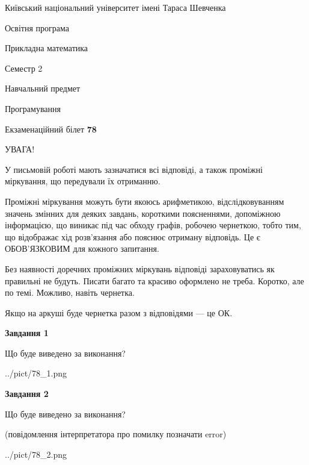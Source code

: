 \documentclass[12pt, ukrainian]{article}
\begin{document}
{{\begin {small}\par
{ \center  Київський національний університет імені Тараса Шевченка \par}
{\parbox {5 cm}{Освітня програма \hfill}{\parbox {7 cm}{Прикладна математика\hfill}}\parbox {6 cm}{\hfill Семестр 2}}\par
{\parbox {5 cm} {Навчальний предмет \hfill}\parbox {7 cm}{Програмування \hfill}\parbox {6cm}{\hfill}\par}\vspace{-7pt} \end{small}}{\center Екзаменаційний білет \No \textbf
{ 78 }\par}}
{
\begin {large}
УВАГА!

У письмовій роботі мають зазначатися всі відповіді, а також проміжні міркування, що передували їх отриманню.

Проміжні міркування можуть бути якоюсь арифметикою, відслідковуванням зна\-чень змінних для деяких завдань,
короткими поясненнями, допоміжною інформацією, що виникає під час обходу графів, робочею чернеткою,
тобто тим, що відображає хід розв’язання або пояснює отриману відповідь.
Це є ОБОВ’ЯЗКОВИМ для кожного запитання.

Без наявності доречних проміжних міркувань відповіді зараховуватись як правиль\-ні не будуть.
Писати багато та красиво оформлено не треба. Коротко, але по темі. Можли\-во, навіть чернетка.

Якщо на аркуші буде чернетка разом з відповідями --- це ОК.

\newpage

{\begin {center}\textbf{Завдання 1}\end {center}}\par
Що буде виведено за виконання?\par
\begin{center}
	{../pict/78_1.png}
\end{center}
\newpage

{\begin {center}\textbf{Завдання 2}\end {center}}\par
Що буде виведено за виконання?\par
 (повідомлення інтерпретатора про помилку позначати error)\par
\begin{center}
	{../pict/78_2.png}
\end{center}
\newpage


\end{large}}
\end{document}
